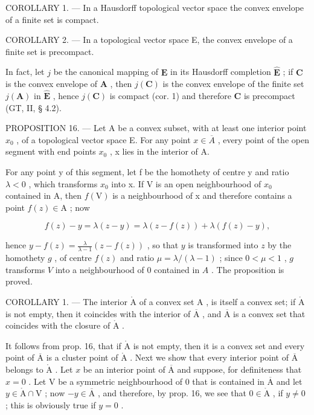 COROLLARY 1. --- In a Hausdorff topological vector space the convex envelope of a finite set is compact.

COROLLARY 2. --- In a topological vector space E, the convex envelope of a finite set is precompact.

In fact, let \(j\) be the canonical mapping of \(\mathbf{E}\) in its Hausdorff completion \(\hat{\mathbf{E}}\) ; if \(\mathbf{C}\) is the convex envelope of \(\mathbf{A}\) , then \(j(\mathbf{C})\) is the convex envelope of the finite set \(j(\mathbf{A})\) in \(\hat{\mathbf{E}}\) , hence \(j(\mathbf{C})\) is compact (cor. 1) and therefore \(\mathbf{C}\) is precompact (GT, II, § 4.2).

PROPOSITION 16. --- Let A be a convex subset, with at least one interior point \(x_{0}\) , of a topological vector space E. For any point \(x \in \overline{A}\) , every point of the open segment with end points \(x_{0}\) , x lies in the interior of A.

For any point y of this segment, let f be the homothety of centre y and ratio \(\lambda < 0\) , which transforms \(x_{0}\) into x. If V is an open neighbourhood of \(x_{0}\) contained in A, then \(f(\mathrm{V})\) is a neighbourhood of x and therefore contains a point \(f(z) \in \mathrm{A}\) ; now

\[
f (z) - y = \lambda (z - y) = \lambda (z - f (z)) + \lambda (f (z) - y),
\]

hence \(y - f(z) = \frac{\lambda}{\lambda - 1} (z - f(z))\) , so that \(y\) is transformed into \(z\) by the homothety \(g\) , of centre \(f(z)\) and ratio \(\mu = \lambda / (\lambda - 1)\) ; since \(0 < \mu < 1\) , \(g\) transforms \(V\) into a neighbourhood of 0 contained in \(A\) . The proposition is proved.

COROLLARY 1. --- The interior \(\mathring{\mathrm{A}}\) of a convex set \(\mathrm{A}\) , is itself a convex set; if \(\mathring{\mathrm{A}}\) is not empty, then it coincides with the interior of \(\overline{\mathrm{A}}\) , and \(\overline{\mathrm{A}}\) is a convex set that coincides with the closure of \(\mathring{\mathrm{A}}\) .

It follows from prop. 16, that if \(\mathring{\mathrm{A}}\) is not empty, then it is a convex set and every point of \(\overline{\mathrm{A}}\) is a cluster point of \(\mathring{\mathrm{A}}\) . Next we show that every interior point of \(\overline{\mathrm{A}}\) belongs to \(\mathring{\mathrm{A}}\) . Let \(x\) be an interior point of \(\overline{\mathrm{A}}\) and suppose, for definiteness that \(x = 0\) . Let \(\mathrm{V}\) be a symmetric neighbourhood of 0 that is contained in \(\overline{\mathrm{A}}\) and let \(y \in \mathring{\mathrm{A}} \cap \mathrm{V}\) ; now \(-y \in \overline{\mathrm{A}}\) , and therefore, by prop. 16, we see that \(0 \in \mathring{\mathrm{A}}\) , if \(y \neq 0\) ; this is obviously true if \(y = 0\) .

